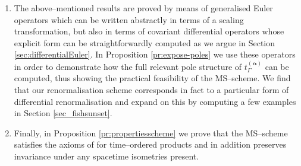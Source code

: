 \documentclass[a4paper,10pt,twoside]{article}
\numberwithin{equation}{section}
\newcounter{and}
\def\balpha{{\boldsymbol{\alpha}}}
\theoremstyle{plain}
\theoremstyle{definition}
\begin{document}
\begin{enumerate}
\item The above--mentioned results are proved by means of generalised Euler operators which can be written abstractly in terms of a scaling transformation, but also in terms of covariant differential operators whose explicit form can be straightforwardly computed as we argue in Section \ref{sec:differentialEuler}.  In Proposition \ref{pr:expose-poles} we use these operators in order to demonstrate how the full relevant pole structure of $t_\Gamma^{(\balpha)}$ can be computed, thus showing the practical feasibility of the MS--scheme. We find that our renormalisation scheme corresponds in fact to a particular form of differential renormalisation and expand on this by computing a few examples in Section \ref{sec_fishsunset}.

\item Finally, in Proposition \ref{pr:propertiesscheme} we prove that the MS--scheme satisfies the axioms of \cite{Hollands:2001b,Hollands:2004yh} for time--ordered products and in addition preserves invariance under any spacetime isometries present.
\end{enumerate}
\end{document}
